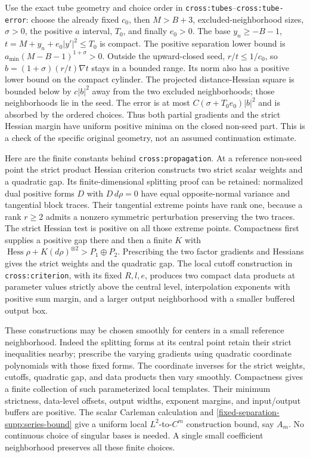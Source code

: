 \documentclass[11pt]{article}
\theoremstyle{definition}
\theoremstyle{remark}
\numberwithin{equation}{section}
\begin{document}
Use the exact tube geometry and choice order in
\texttt{cross:tubes}--\texttt{cross:tube-error}: choose the already
fixed $c_0$, then $M>B+3$, excluded-neighborhood sizes, $\sigma>0$,
the positive $a$ interval, $T_0$, and finally $e_0>0$.
The base $y_n\ge-B-1$, $t=M+y_n+e_0|y'|^2\le T_0$ is compact.
The positive separation lower bound is
$a_{\min}(M-B-1)^{1+\sigma}>0$. Outside the upward-closed seed,
$r/t\le1/c_0$, so $b=(1+\sigma)(r/t)\nabla t$ stays in a bounded
range. Its norm also has a positive lower bound on the compact cylinder.
The projected distance-Hessian square is bounded below by $c|b|^2$
away from the two excluded neighborhoods; those neighborhoods lie in
the seed. The error is at most
$C(\sigma+T_0e_0)|b|^2$ and is absorbed by the ordered choices.
Thus both partial gradients and the strict Hessian margin have uniform
positive minima on the closed non-seed part. This is a check of the
specific original geometry, not an assumed continuation estimate.

Here are the finite constants behind \texttt{cross:propagation}.
At a reference non-seed point the strict product Hessian criterion
constructs two strict scalar weights and a quadratic gap. Its
finite-dimensional splitting proof can be retained: normalized dual
positive forms $D$ with $D\,d\rho=0$ have equal opposite-normal
variance and tangential block traces. Their tangential extreme points
have rank one, because a rank $r\ge2$ admits a nonzero symmetric
perturbation preserving the two traces. The strict Hessian test is
positive on all those extreme points. Compactness first supplies a
positive gap there and then a finite $K$ with
$\operatorname{Hess}\rho+K(d\rho)^{\otimes2}>P_1\oplus P_2$.
Prescribing the two factor gradients and Hessians gives the strict
weights and the quadratic gap. The local cutoff construction in
\texttt{cross:criterion}, with its fixed $R,l,e$, produces two compact
data products at parameter values strictly above the central level,
interpolation exponents with positive sum margin, and a larger output
neighborhood with a smaller buffered output box.

These constructions may be chosen smoothly for centers in a small
reference neighborhood. Indeed the splitting forms at its central
point retain their strict inequalities nearby; prescribe the varying
gradients using quadratic coordinate polynomials with those fixed
forms. The coordinate inverses for the strict weights, cutoffs,
quadratic gap, and data products then vary smoothly. Compactness gives
a finite collection of such parameterized local templates. Their
minimum strictness, data-level offsets, output widths, exponent
margins, and input/output buffers are positive. The scalar Carleman
calculation and \eqref{fixed-separation-supp:series-bound} give a
uniform local $L^2$-to-$C^m$ construction bound, say $A_m$. No
continuous choice of singular bases is needed. A single small
coefficient neighborhood preserves all these finite choices.
\end{document}
